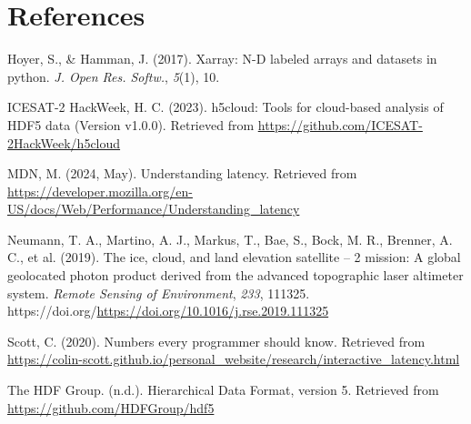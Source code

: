 \documentclass[
]{agujournal2019}
\newlength{\cslhangindent}
\newenvironment{CSLReferences}[2] %
 {\begin{list}{}{%
  \setlength{\itemindent}{0pt}
  \setlength{\leftmargin}{0pt}
  \setlength{\parsep}{0pt}
  \ifodd #1
   \setlength{\leftmargin}{\cslhangindent}
   \setlength{\itemindent}{-1\cslhangindent}
  \fi
  \setlength{\itemsep}{#2\baselineskip}}}
 {\end{list}}
\begin{document}
\section{References}\label{references}

\label{refs}
\begin{CSLReferences}{1}{0}
\vspace{1em}

Hoyer, S., \& Hamman, J. (2017). Xarray: {N-D} labeled arrays and
datasets in python. \emph{J. Open Res. Softw.}, \emph{5}(1), 10.

ICESAT-2 HackWeek, H. C. (2023). h5cloud: Tools for cloud-based analysis
of HDF5 data (Version v1.0.0). Retrieved from
\url{https://github.com/ICESAT-2HackWeek/h5cloud}

MDN, M. (2024, May). Understanding latency. Retrieved from
\url{https://developer.mozilla.org/en-US/docs/Web/Performance/Understanding_latency}

Neumann, T. A., Martino, A. J., Markus, T., Bae, S., Bock, M. R.,
Brenner, A. C., et al. (2019). The ice, cloud, and land elevation
satellite -- 2 mission: A global geolocated photon product derived from
the advanced topographic laser altimeter system. \emph{Remote Sensing of
Environment}, \emph{233}, 111325.
https://doi.org/\url{https://doi.org/10.1016/j.rse.2019.111325}

Scott, C. (2020). Numbers every programmer should know. Retrieved from
\url{https://colin-scott.github.io/personal_website/research/interactive_latency.html}

The HDF Group. (n.d.). {Hierarchical Data Format, version 5}. Retrieved
from \url{https://github.com/HDFGroup/hdf5}

\end{CSLReferences}
\end{document}
